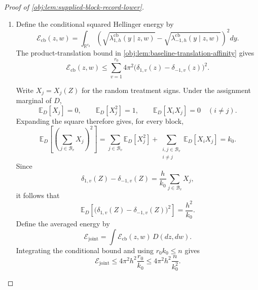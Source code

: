 \begin{proof}[Proof of \cref{obj:lem:supplied-block-record-lower}]
\begin{enumerate}
\item Define the conditional squared Hellinger energy by
\[
\mathcal E_{\mathrm{cb}}(z,w)
=
\int_{\mathbb R^{r_0}}
\left(
\sqrt{\lambda^{\mathrm{cb}}_{1,h}(y\mid z,w)}
-
\sqrt{\lambda^{\mathrm{cb}}_{-1,h}(y\mid z,w)}
\right)^2dy.
\]
The product-translation bound in
\cref{obj:lem:baseline-translation-affinity} gives
\[
\mathcal E_{\mathrm{cb}}(z,w)
\le
\sum_{v=1}^{r_0}
4\pi^2
\bigl(\delta_{1,v}(z)-\delta_{-1,v}(z)\bigr)^2.
\]

Write \(X_j=X_j(Z)\) for the random treatment signs. Under the assignment marginal of \(D\),
\[
\mathbb E_D[X_j]=0,
\qquad
\mathbb E_D[X_j^2]=1,
\qquad
\mathbb E_D[X_iX_j]=0\quad(i\ne j).
\]
Expanding the square therefore gives, for every block,
\[
\mathbb E_D
\left[\left(\sum_{j\in\mathcal B_v}X_j\right)^2\right]
=
\sum_{j\in\mathcal B_v}\mathbb E_D[X_j^2]
+
\sum_{\substack{i,j\in\mathcal B_v\\i\ne j}}
\mathbb E_D[X_iX_j]
=k_0.
\]
Since
\[
\delta_{1,v}(Z)-\delta_{-1,v}(Z)
=
\frac{h}{k_0}\sum_{j\in\mathcal B_v}X_j,
\]
it follows that
\[
\mathbb E_D
\left[
\bigl(\delta_{1,v}(Z)-\delta_{-1,v}(Z)\bigr)^2
\right]
=
\frac{h^2}{k_0}.
\]
Define the averaged energy by
\[
\mathcal E_{\mathrm{joint}}
=
\int\mathcal E_{\mathrm{cb}}(z,w)\,D(dz,dw).
\]
Integrating the conditional bound and using \(r_0k_0\le n\) gives
\[
\mathcal E_{\mathrm{joint}}
\le
4\pi^2h^2\frac{r_0}{k_0}
\le
4\pi^2h^2\frac{n}{k_0^2}.
\]


\end{enumerate}
\end{proof}
